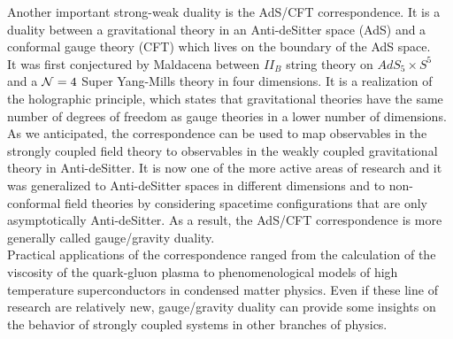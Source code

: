 Another important strong-weak duality is the AdS/CFT correspondence. 
It is a duality between a gravitational theory in an Anti-deSitter space (AdS) and a conformal gauge theory (CFT) which lives on the boundary of the AdS space. \\
It was first conjectured by Maldacena \cite{Maldacena:1997re} between $II_B$ string theory on $AdS_5 \times S^5$ and a $\mathcal{N}=4$ Super Yang-Mills theory in four dimensions. 
It is a realization of the holographic principle, which states that gravitational theories have the same number of degrees of freedom as gauge theories in a lower number of dimensions.\\
As we anticipated, the correspondence can be used to map observables in the strongly coupled field theory to observables in the weakly coupled gravitational theory in Anti-deSitter.
It is now one of the more active areas of research and it was generalized to Anti-deSitter spaces in different dimensions and to non-conformal field theories by considering spacetime configurations that are only asymptotically Anti-deSitter.
As a result, the AdS/CFT correspondence is more generally called gauge/gravity duality.  \\
Practical applications of the correspondence ranged from the calculation of the viscosity of the quark-gluon plasma to phenomenological models of high temperature superconductors in condensed matter physics.
Even if these line of research are relatively new, gauge/gravity duality can provide some insights on the behavior of strongly coupled systems in other branches of physics.   
\\ 



